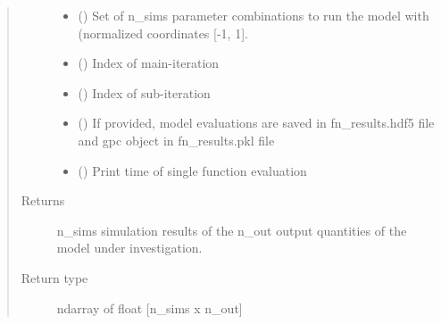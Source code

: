 \documentclass[letterpaper,10pt,english,openany,oneside]{sphinxmanual}
\begin{document}
\begin{fulllineitems}
\begin{fulllineitems}
\begin{quote}
\begin{description}
\begin{itemize}
\item {} 
 (\sphinxstyleliteralemphasis{\sphinxupquote{ {[}}}\sphinxstyleliteralemphasis{\sphinxupquote{, }}\sphinxstyleliteralemphasis{\sphinxupquote{{]}}}) \textendash{} Set of n\_sims parameter combinations to run the model with (normalized coordinates {[}-1, 1{]}.

\item {} 
 () \textendash{} Index of main-iteration

\item {} 
 () \textendash{} Index of sub-iteration

\item {} 
 (\sphinxstyleliteralemphasis{\sphinxupquote{, }}\sphinxstyleliteralemphasis{\sphinxupquote{, }}) \textendash{} If provided, model evaluations are saved in fn\_results.hdf5 file and gpc object in fn\_results.pkl file

\item {} 
 () \textendash{} Print time of single function evaluation

\end{itemize}

\item[{Returns}] \leavevmode
{} \textendash{} n\_sims simulation results of the n\_out output quantities of the model under investigation.

\item[{Return type}] \leavevmode
ndarray of float {[}n\_sims x n\_out{]}

\end{description}\end{quote}

\end{fulllineitems}


\end{fulllineitems}
\end{document}
